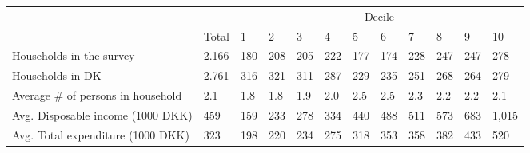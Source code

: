 \begin{tabular}{llllllllllll}
                                    &       & \multicolumn{10}{c}{Decile}                                 \\ \cline{3-12} 
                                    & Total & 1   & 2   & 3   & 4   & 5   & 6   & 7   & 8   & 9   & 10    \\ \hline
Households in the survey            & 2.166 & 180 & 208 & 205 & 222 & 177 & 174 & 228 & 247 & 247 & 278   \\
Households in DK                    & 2.761 & 316 & 321 & 311 & 287 & 229 & 235 & 251 & 268 & 264 & 279   \\
Average \# of persons in household  & 2.1   & 1.8 & 1.8 & 1.9 & 2.0 & 2.5 & 2.5 & 2.3 & 2.2 & 2.2 & 2.1   \\ \hline
Avg. Disposable income (1000 DKK)   & 459   & 159 & 233 & 278 & 334 & 440 & 488 & 511 & 573 & 683 & 1,015 \\
Avg. Total expenditure (1000   DKK) & 323   & 198 & 220 & 234 & 275 & 318 & 353 & 358 & 382 & 433 & 520  \\ \hline
\end{tabular}